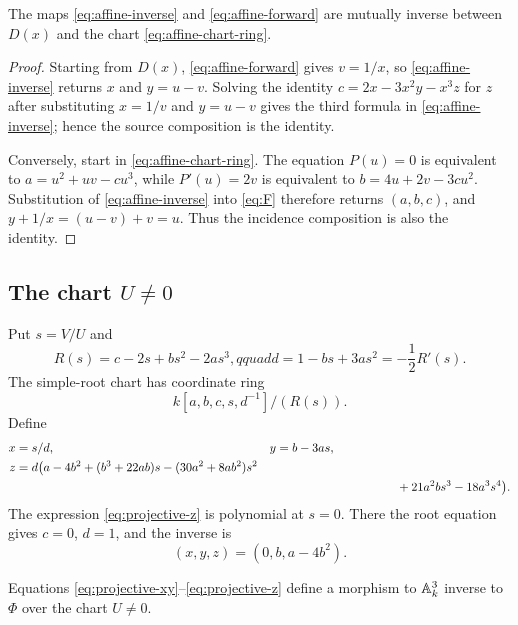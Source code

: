 \begin{lemma}\label{lem:affine-mutual}
The maps \eqref{eq:affine-inverse} and \eqref{eq:affine-forward} are mutually
inverse between $D(x)$ and the chart \eqref{eq:affine-chart-ring}.
\end{lemma}

\begin{proof}
Starting from $D(x)$, \eqref{eq:affine-forward} gives $v=1/x$, so
\eqref{eq:affine-inverse} returns $x$ and $y=u-v$.  Solving the identity
$c=2x-3x^2y-x^3z$ for $z$ after substituting $x=1/v$ and $y=u-v$ gives the
third formula in \eqref{eq:affine-inverse}; hence the source composition is
the identity.

Conversely, start in \eqref{eq:affine-chart-ring}.  The equation $P(u)=0$
is equivalent to $a=u^2+uv-cu^3$, while $P'(u)=2v$ is equivalent to
$b=4u+2v-3cu^2$.  Substitution of \eqref{eq:affine-inverse} into
\eqref{eq:F} therefore returns $(a,b,c)$, and
$y+1/x=(u-v)+v=u$.  Thus the incidence composition is also the identity.
\end{proof}

\subsection{The chart \texorpdfstring{$U\ne0$}{U nonzero}}

Put $s=V/U$ and
\begin{equation}\label{eq:R-d}
 R(s)=c-2s+bs^2-2as^3,qquad
 d=1-bs+3as^2=-\frac12R'(s).
\end{equation}
The simple-root chart has coordinate ring
\[
 k[a,b,c,s,d^{-1}]/(R(s)).
\]
Define
\begin{align}
x&=s/d,& y&=b-3as,\label{eq:projective-xy}\\
z&=d\bigl(a-4b^2+(b^3+22ab)s-(30a^2+8ab^2)s^2\nonumber\\
 & & &\hspace{35mm}+21a^2bs^3-18a^3s^4\bigr).\label{eq:projective-z}
\end{align}
The expression \eqref{eq:projective-z} is polynomial at $s=0$.  There the
root equation gives $c=0$, $d=1$, and the inverse is
\begin{equation}\label{eq:infinity-source}
 (x,y,z)=(0,b,a-4b^2).
\end{equation}

\begin{lemma}\label{lem:projective-mutual}
Equations \eqref{eq:projective-xy}--\eqref{eq:projective-z} define a morphism
to $\mathbb A^3_k$ inverse to $\Phi$ over the chart $U\ne0$.
\end{lemma}

